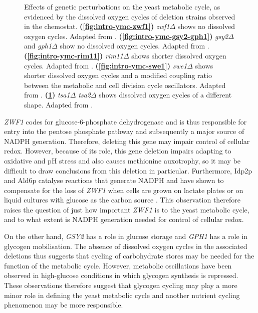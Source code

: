 \begin{figure}[p]
\begin{subfigure}[htpb]{0.4\textwidth}
   \caption{
   }
   \label{fig:intro-ymc-tsa1-tsa2}
  \end{subfigure}
  \caption[
    Effects of genetic perturbations on the yeast metabolic cycle
  ]{
    Effects of genetic perturbations on the yeast metabolic cycle, as evidenced by the dissolved oxygen cycles of deletion strains observed in the chemostat.
    \textbf{(\ref{fig:intro-ymc-zwf1})}
    \textit{zwf1$\Delta$} shows no dissolved oxygen cycles.
    Adapted from \textcite{tuCyclicChangesMetabolic2007}.
    \textbf{(\ref{fig:intro-ymc-gsy2-gph1})}
    \textit{gsy2$\Delta$} and \textit{gph1$\Delta$} show no dissolved oxygen cycles.
    Adapted from \textcite{oneillEukaryoticCellBiology2020}.
    \textbf{(\ref{fig:intro-ymc-rim11})}
    \textit{rim11$\Delta$} shows shorter dissolved oxygen cycles.
    Adapted from \textcite{caustonMetabolicCyclesYeast2015}.
    \textbf{(\ref{fig:intro-ymc-swe1})}
    \textit{swe1$\Delta$} shows shorter dissolved oxygen cycles and a modified coupling ratio between the metabolic and cell division cycle oscillators.
    Adapted from \textcite{caustonMetabolicCyclesYeast2015}.
    \textbf{(\ref{fig:intro-ymc-tsa1-tsa2})}
    \textit{tsa1$\Delta$ tsa2$\Delta$} shows dissolved oxygen cycles of a different shape.
    Adapted from \textcite{caustonMetabolicCyclesYeast2015}.
  }
  \label{fig:intro-ymc-del}
\end{figure}

\textit{ZWF1} codes for glucose-6-phosphate dehydrogenase and is thus responsible for entry into the pentose phosphate pathway and subsequently a major source of NADPH generation.
Therefore, deleting this gene may impair control of cellular redox.
However, because of its role, this gene deletion impairs adapting to oxidative and pH stress and also causes methionine auxotrophy, so it may be difficult to draw conclusions from this deletion in particular.
Furthermore, Idp2p and Ald6p catalyse reactions that generate NADPH and have shown to compensate for the loss of \textit{ZWF1} when cells are grown on lactate plates or on liquid cultures with glucose as the carbon source \parencite{minardSourcesNADPHYeast2005}.
This observation therefore raises the question of just how important \textit{ZWF1} is to the yeast metabolic cycle, and to what extent is NADPH generation needed for control of cellular redox.

On the other hand, \textit{GSY2} has a role in glucose storage and \textit{GPH1} has a role in glycogen mobilisation.
The absence of dissolved oxygen cycles in the associated deletions thus suggests that cycling of carbohydrate stores may be needed for the function of the metabolic cycle.
However, metabolic oscillations have been observed in high-glucose conditions \parencite{papagiannakisAutonomousMetabolicOscillations2017, baumgartnerFlavinbasedMetabolicCycles2018} in which glycogen synthesis is repressed.
These observations therefore suggest that glycogen cycling may play a more minor role in defining the yeast metabolic cycle and another nutrient cycling phenomenon may be more responsible.

